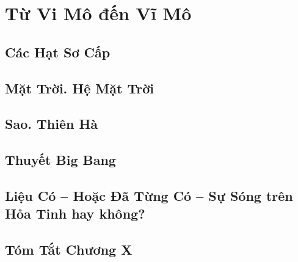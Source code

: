 \documentclass{article}
\numberwithin{equation}{section}
\begin{document}

\section{Từ Vi Mô đến Vĩ Mô}

\subsection{Các Hạt Sơ Cấp}


\subsection{Mặt Trời. Hệ Mặt Trời}


\subsection{Sao. Thiên Hà}


\subsection{Thuyết Big Bang}


\subsection{Liệu Có -- Hoặc Đã Từng Có -- Sự Sóng trên Hỏa Tinh hay không?}

\subsection{Tóm Tắt Chương X}


\printbibliography[heading=bibintoc]
	
\end{document}
